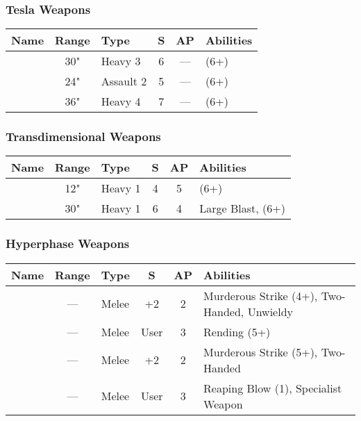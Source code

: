 \subsubsection{Tesla Weapons}
\label{Tesla Cannon} \label{Tesla Carbine} \label{Tesla Destructor}
\noindent
\begin{NiceTabular}{L{115 pt} c C{40pt} *{2}{c} >{\raggedright\arraybackslash}p{240pt}}
	Name & Range & Type & S & AP & Abilities \\
	\hline
	 & 30" & Heavy 3 & 6 & — &  (6+) \\
	  & 24" & Assault 2 & 5 & — &  (6+) \\	
	 & 36" & Heavy 4 & 7 & — &  (6+)
\end{NiceTabular}


\subsubsection{Transdimensional Weapons}
\label{Transdimensional Beamer}
\noindent
\begin{NiceTabular}{L{115 pt} c C{40pt} *{2}{c} >{\raggedright\arraybackslash}p{240pt}}
	Name & Range & Type & S & AP & Abilities \\
	\hline
	 & 12" & Heavy 1 & 4 & 5 &  (6+) \\
	  & 30" & Heavy 1 & 6 & 4 & Large Blast,  (6+) \\
\end{NiceTabular}


 \label{Close Combat Weapons}

\subsubsection{Hyperphase Weapons} 

\label{Hyperphase Sword} \label{Hyperphase Thresher} \label{Hyperphase Reap-Blade} \label{Hyperphase Harvester}
\noindent
\begin{NiceTabular}{L{115 pt} c C{40pt} *{2}{c} >{\raggedright\arraybackslash}p{240pt}}
	Name & Range & Type & S & AP & Abilities \\
	\hline
	 & — & Melee & +2 & 2 & Murderous Strike (4+), Two-Handed, Unwieldy \\
	  & — & Melee & User & 3 & Rending (5+) \\
	 & — & Melee & +2 & 2 & Murderous Strike (5+), Two-Handed \\
	  & — & Melee & User & 3 & Reaping Blow (1), Specialist Weapon \\
\end{NiceTabular}

